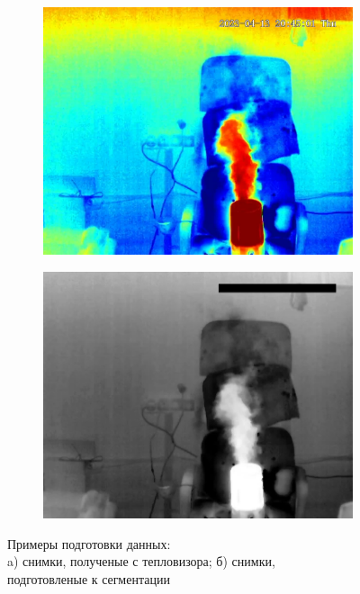 \documentclass[t]{beamer}
\begin{document}
\begin{frame}
\begin{figure}[ht!]
							\begin{subfigure}{0.3\textwidth}
									\centering
									\includegraphics[width = \textwidth]{image/examp222}
									\caption{}
							\end{subfigure}
							\begin{subfigure}{0.3\textwidth}
								\centering
								\includegraphics[width = \textwidth]{image/1tep}
								\caption{}
							\end{subfigure}
							\centering
							\vspace*{-0.25cm}
							\caption{Примеры подготовки данных: \\a) снимки, полученые с тепловизора; б) снимки,\\ подготовленые к сегментации}
							\label{fig:Examples}
						\end{figure}

		
	\end{frame}
\end{document}
